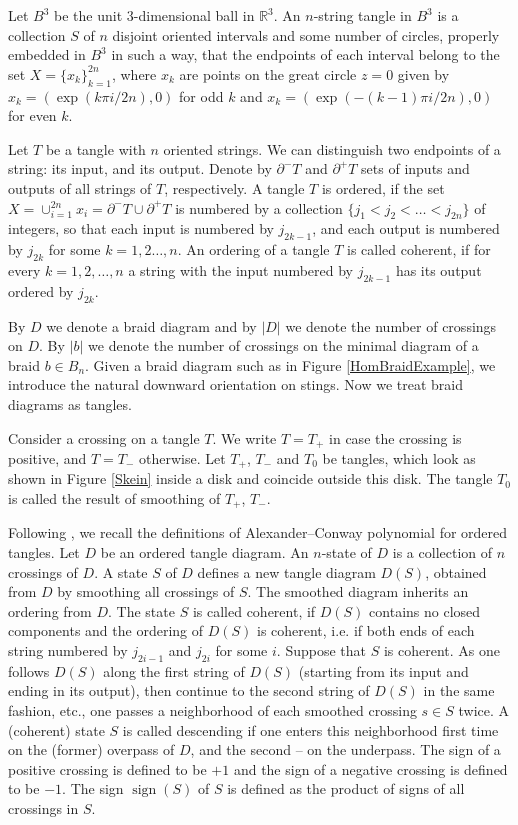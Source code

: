 \documentclass[11pt]{amsart}
\theoremstyle{plain}
\theoremstyle{definition}
\numberwithin{equation}{section}
\begin{document}
Let $B^3$ be the unit 3-dimensional ball in $\mathbb{R}^3$. An $n$-string tangle in $B^3$ is a collection $S$ of $n$ disjoint oriented intervals and some number of circles, properly embedded in $B^3$ in such a way, that the endpoints of each interval belong to the set $X=\{x_k\}_{k=1}^{2n}$, where $x_k$ are points on the great circle $z=0$ given by $x_k=(\exp(k\pi i/2n),0)$ for odd $k$ and $x_k=(\exp(-(k-1)\pi i/2n),0)$ for even $k$. 

Let $T$ be a tangle with $n$ oriented strings. We can distinguish two endpoints of a string: its input, and its output. Denote by $\partial^- T$ and $\partial^+ T$ sets of inputs and outputs of all strings of $T$, respectively. A tangle $T$ is ordered, if the set $X=\cup_{i=1}^{2n}x_i=\partial^- T\cup \partial^+ T$ is numbered by a collection $\{j_1<j_2<\dots<j_{2n}\}$ of integers, so that each input is numbered by $j_{2k-1}$, and each output is numbered by $j_{2k}$ for some $k=1,2\dots,n$. An ordering of a tangle $T$ is called coherent, if for every $k=1,2,\dots,n$ a string with the input numbered by $j_{2k-1}$ has its output ordered by $j_{2k}$.

By $D$ we denote a braid diagram and by $|D|$ we denote the number of crossings on $D$. By $|b|$ we denote the number of crossings on the minimal diagram of a braid $b \in B_n$. Given a braid diagram such as in Figure \ref{HomBraidExample}, we introduce the natural downward orientation on stings. Now we treat braid diagrams as tangles. 

Consider a crossing on a tangle $T$. We write $T = T_+$ in case the crossing is positive, and $T = T_-$ otherwise. Let $T_+$, $T_-$ and $T_0$ be tangles, which look as shown in Figure \ref{Skein} inside a disk and coincide outside this disk. The tangle $T_0$ is called the result of smoothing of $T_+$, $T_-$.

Following \cite{Polyak}, we recall the definitions of Alexander--Conway polynomial for ordered tangles. Let $D$ be an ordered tangle diagram. An $n$-state of $D$ is a collection of $n$ crossings of $D$. A state $S$ of $D$ defines a new tangle diagram $D(S)$, obtained from $D$ by smoothing all crossings of $S$. The smoothed diagram inherits an ordering from $D$. The state $S$ is called coherent, if $D(S)$ contains no closed components and the ordering of $D(S)$ is coherent, i.e. if both ends of each string numbered by $j_{2i-1}$ and $j_{2i}$ for some $i$. Suppose that $S$ is coherent. As one follows $D(S)$ along the first string of $D(S)$ (starting from its input and ending in its output), then continue to the second string of $D(S)$ in the same fashion, etc., one passes a neighborhood of each smoothed crossing $s\in S$ twice. A (coherent) state $S$ is called descending if one enters this neighborhood first time on the (former) overpass of $D$, and the second -- on the underpass. The sign of a positive crossing is defined to be $+1$ and the sign of a negative crossing is defined to be $-1$. The sign $\operatorname{sign}(S)$ of $S$ is defined as the product of signs of all crossings in $S$.
\end{document}
